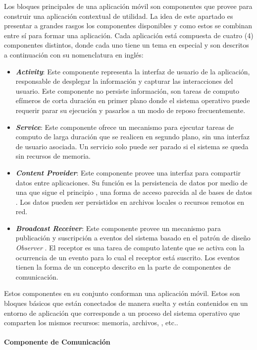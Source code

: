 Los bloques principales de una aplicación móvil son componentes que
 provee para construir una aplicación contextual de
utilidad. La idea de este apartado es presentar a grandes rasgos los
componentes disponibles y como estos se combinan entre sí para formar
una aplicación. Cada aplicación está compuesta de cuatro (4) componentes
distintos, donde cada uno tiene un tema en especial \cite{Gargenta2014}
y son descritos a continuación con su nomenclatura en inglés:
\begin{itemize}
\item \textbf{\emph{Activity}}: Este componente representa la interfaz de
usuario de la aplicación, responsable de desplegar la información
y capturar las interacciones del usuario. Este componente no persiste
información, son tareas de computo efímeros de corta duración en primer
plano donde el sistema operativo puede requerir parar su ejecución
y pasarlos a un modo de reposo frecuentemente.
\item \textbf{\emph{Service}}: Este componente ofrece un mecanismo para
ejecutar tareas de computo de larga duración que se realicen en segundo
plano, sin una interfaz de usuario asociada. Un servicio solo puede
ser parado si el sistema se queda sin recursos de memoria.
\item \textbf{\emph{Content Provider}}: Este componente provee una interfaz
para compartir datos entre aplicaciones. Su función es la persistencia
de datos por medio de una  que sigue el principio ,
una forma de acceso parecida al de bases de datos . Los
datos pueden ser persistidos en archivos locales o recursos remotos
en red.
\item \textbf{\emph{Broadcast Receiver}}: Este componente provee un mecanismo
para publicación y suscripción a eventos del sistema basado en el
patrón de diseño \emph{Observer} \cite{Shalloway2004}. El receptor
es una tarea de computo latente que se activa con la ocurrencia de
un evento para lo cual el receptor está suscrito. Los eventos tienen
la forma de un concepto descrito en la parte de componentes de comunicación.
\end{itemize}
Estos componentes en su conjunto conforman una aplicación móvil. Estos
son bloques básicos que están conectados de manera suelta y están
contenidos en un entorno de aplicación que corresponde a un proceso
del sistema operativo que comparten los mismos recursos: memoria,
archivos, , etc..

\paragraph{Componente de Comunicación}

